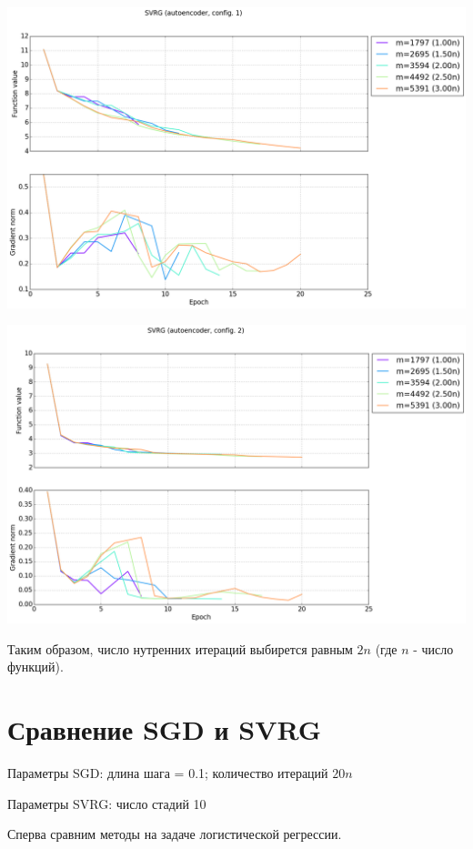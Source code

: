 \documentclass[12pt, a4paper]{article}
\begin{document}
    \begin{center}\includegraphics[width=\picwidth]{svrg_autoencoder_conf1.png}\end{center}
    \begin{center}\includegraphics[width=\picwidth]{svrg_autoencoder_conf2.png}\end{center}

    Таким образом, число нутренних итераций выбирется равным $2n$ (где $n$ - число функций).

    \section{Сравнение SGD и SVRG}
    Параметры SGD: длина шага = 0.1; количество итераций $20n$

    Параметры SVRG: число стадий 10

    Сперва сравним методы на задаче логистической регрессии.
\end{document}
